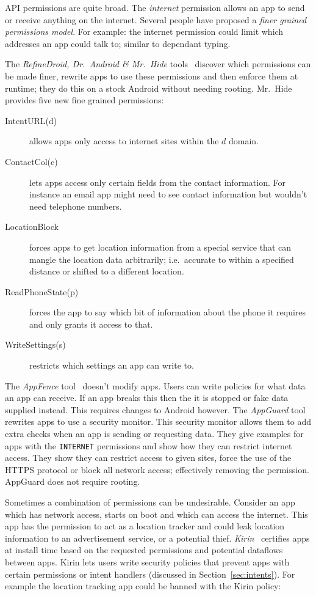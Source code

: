 \documentclass[a4paper]{article}
\begin{document}
API permissions are quite broad. 
The \emph{internet} permission allows an app to send or receive anything on the
internet. Several people have proposed a \emph{finer grained permissions model}.
For example: the internet permission could limit which addresses an app could
talk to; similar to dependant typing.

The \emph{RefineDroid, Dr.~Android \& Mr.~Hide} tools~\cite{Jeon:2012ki} discover
which permissions can be made finer, rewrite apps to use these permissions and
then enforce them at runtime; they do this on a stock Android without needing
rooting.  Mr.\ Hide provides five new fine grained permissions:

\begin{description}
  \item[IntentURL(d)] allows apps only access to internet sites within the
    $d$ domain.
  \item[ContactCol(c)] lets apps access only certain fields from the contact
    information.  For instance an email app might need to see contact
    information but wouldn't need telephone numbers.
  \item[LocationBlock] forces apps to get location information from a special
    service that can mangle the location data arbitrarily; i.e.\ accurate to within
    a specified distance or shifted to a different location.
  \item[ReadPhoneState(p)] forces the app to say which bit of information about
    the phone it requires and only grants it access to that.
  \item[WriteSettings(s)] restricts which settings an app can write to.
\end{description}

The \emph{AppFence} tool~\cite{Hornyack:2011wq} doesn't modify apps.  Users can
write policies for what data an app can receive. If an app breaks this then the
it is stopped or fake data supplied instead.  This requires changes to Android
however. The \emph{AppGuard} tool~\cite{Backes:2012vm} rewrites
apps to use a security monitor.  This security monitor allows them to add extra
checks when an app is sending or requesting data.  They give examples for apps
with the \texttt{INTERNET} permissions and show how they can restrict internet
access.  They show they can restrict access to given sites, force the use of the
HTTPS protocol or block all network access; effectively removing the permission.
AppGuard does not require rooting.

Sometimes a combination of permissions can be undesirable.  Consider an app
which has network access, starts on boot and which can access the internet.
This app has the permission to act as a location tracker and could leak location
information to an advertisement service, or a potential thief.
\emph{Kirin}~\cite{Enck:2009ko} certifies apps at install time based on
the requested permissions and potential dataflows between apps.
Kirin lets users write security policies that prevent apps with certain
permissions or intent handlers (discussed in Section~\ref{sec:intents}).  For
example the location tracking app could be banned with the Kirin policy:
\end{document}
